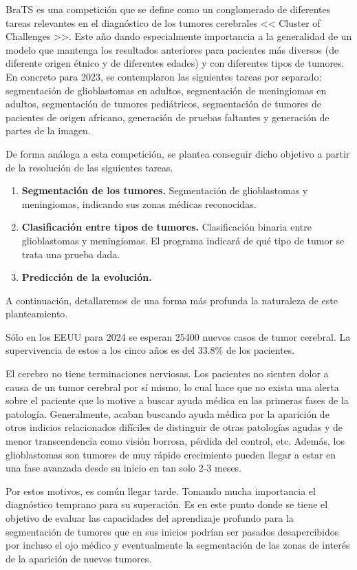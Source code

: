 BraTS es una competición que se define como un conglomerado de diferentes tareas relevantes en el diagnóstico de los tumores cerebrales << Cluster of Challenges >>. Este año dando especialmente importancia a la generalidad de un modelo que mantenga los resultados anteriores para pacientes más diversos (de diferente origen étnico y de diferentes edades) y con diferentes tipos de tumores. En concreto para 2023, se contemplaron las siguientes tareas por separado: segmentación de glioblastomas en adultos, segmentación de meningiomas en adultos, segmentación de tumores pediátricos, segmentación de tumores de pacientes de origen africano, generación de pruebas faltantes y generación de partes de la imagen.

De forma análoga a esta competición, se plantea conseguir dicho objetivo a partir de la resolución de las siguientes tareas.

\begin{enumerate}
	\item \textbf{Segmentación de los tumores.} 
	Segmentación de glioblastomas y meningiomas, indicando sus zonas médicas reconocidas.
	\item \textbf{Clasificación entre tipos de tumores.} Clasificación binaria entre glioblastomas y meningiomas. El programa indicará de qué tipo de tumor se trata una prueba dada.
	\item \textbf{Predicción de la evolución.} 
\end{enumerate}

A continuación, detallaremos de una forma más profunda la naturaleza de este planteamiento.

Sólo en los EEUU para 2024 se esperan 25400 nuevos casos de tumor cerebral. La supervivencia de estos a los cinco años es del $33.8 \%$ de los pacientes. \cite{cancerorg}

El cerebro no tiene terminaciones nerviosas. Los pacientes no sienten dolor a causa de un tumor cerebral por sí mismo, lo cual hace que no exista una alerta sobre el paciente que lo motive a buscar ayuda médica en las primeras fases de la patología. Generalmente, acaban buscando ayuda médica por la aparición de otros indicios relacionados difíciles de distinguir de otras patologías agudas y de menor transcendencia como visión borrosa, pérdida del control, etc. Además, los glioblastomas son tumores de muy rápido crecimiento pueden llegar a estar en una fase avanzada desde su inicio en tan solo 2-3 meses.

Por estos motivos, es común llegar tarde. Tomando mucha importancia el diagnóstico temprano para su superación. Es en este punto donde se tiene el objetivo de evaluar las capacidades del aprendizaje profundo para la segmentación de tumores que en sus inicios podrían ser pasados desapercibidos por incluso el ojo médico y eventualmente la segmentación de las zonas de interés de la aparición de nuevos tumores.

